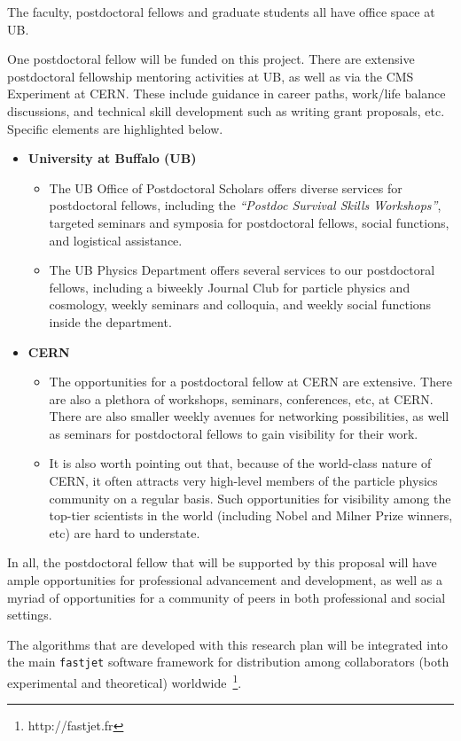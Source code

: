 \documentclass[times,11pt]{article}
\begin{document}
The faculty, postdoctoral fellows and graduate students all have
office space at UB. 


\newpage
{}
\renewcommand{\thepage} {D--\arabic{page}}

One postdoctoral fellow will be funded on this project. There are
extensive postdoctoral fellowship mentoring activities at UB, as well
as via the CMS
Experiment at CERN. These include guidance in career paths,
work/life balance discussions, and technical skill development such as
writing grant proposals, etc. Specific elements are highlighted
below. 

\begin{itemize}
\item {\bf University at Buffalo (UB)}
\begin{itemize}
\item The UB Office of Postdoctoral Scholars offers diverse services
  for postdoctoral fellows, including the {\sl ``Postdoc Survival
    Skills Workshops''}, targeted seminars and symposia for
  postdoctoral fellows, social functions, and logistical assistance. 
\item The UB Physics Department offers several services to our
  postdoctoral fellows, including a biweekly Journal Club for particle
  physics and cosmology, weekly seminars and colloquia, and weekly
  social functions inside the department. 
\end{itemize}
\item {\bf CERN}
\begin{itemize}
\item The opportunities for a postdoctoral fellow at CERN
  are extensive. There are also a plethora of workshops,
  seminars, conferences, etc, at CERN. There are also smaller weekly
  avenues for networking possibilities, as well as seminars for
  postdoctoral fellows to gain visibility for their work. 
\item It is also worth pointing out that, because of the world-class
  nature of CERN, it often attracts very high-level members of the
  particle physics community on a regular basis. Such opportunities
  for visibility among the top-tier scientists in the world (including
  Nobel and Milner Prize winners, etc) are hard to understate. 
\end{itemize}
\end{itemize}

In all, the postdoctoral fellow that will be supported by this
proposal will have ample opportunities for professional advancement
and development, as well as a myriad of opportunities for a community
of peers in both professional and social settings. 



\newpage
{}
\renewcommand{\thepage} {E--\arabic{page}}

The algorithms that are developed with this research plan will be
integrated into the main {\tt fastjet} software framework for
distribution among collaborators (both experimental and theoretical)
worldwide~\footnote{http://fastjet.fr}. 
\end{document}
